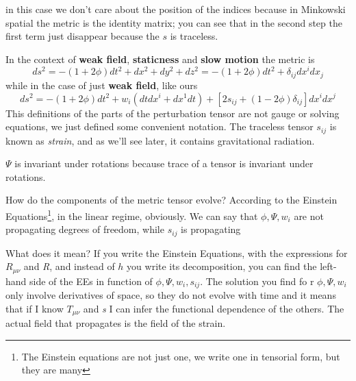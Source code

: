 in this case we don't care about the position of the indices because in Minkowski spatial the metric is the identity matrix; you can see that in the second step the first term just disappear because the $s$ is traceless.\par
In the context of \textbf{weak field}, \textbf{staticness} and \textbf{slow motion} the metric is
\[
ds^{2} = - \left( 1+2\phi  \right)dt^{2}+dx^{2}+dy^{2}+dz^{2} = -\left( 1+2\phi  \right)dt^{2}+ \delta _{ij}dx^{i}dx_{j}		
\]
while in the case of just \textbf{weak field}, like ours
\[
ds^{2} = - \left( 1+2\phi  \right)dt^{2} + w_{i}\left( dtdx^{i}+dx^{1}dt \right)+\left[ 2s_{ij}+\left( 1-2\phi  \right)\delta _{ij} \right]dx^{i}dx^{j}
\]
This definitions of the parts of the perturbation tensor are not gauge or solving equations, we just defined some convenient notation. The traceless tensor $s_{ij}$ is known as \emph{strain}, and as we'll see later, it contains gravitational radiation. \par
$\Psi $ is invariant under rotations because trace of a tensor is invariant under rotations.\par
How do the components of the metric tensor evolve? According to the Einstein Equations\footnote{The Einstein equations are not just one, we write one in tensorial form, but they are many}, in the linear regime, obviously. We can say that $\phi , \Psi , w_{i}$ are not propagating degrees of freedom, while $s_{ij}$ is propagating

What does it mean? If you write the Einstein Equations, with the expressions for $R_{\mu \nu }$ and \emph{R}, and instead of $h$ you write its decomposition, you can find the left-hand side of the EEs in function of $\phi ,\Psi , w_{i},s_{ij}$. The solution you find fo r $\phi ,\Psi ,w_{i}$ only involve derivatives of space, so they do not evolve with time and it means that if I know $T_{\mu \nu }$ and \emph{s} I can infer the functional dependence of the others. The actual field that propagates is the field of the strain.























